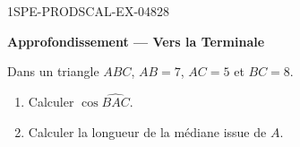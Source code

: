\begin{exercice}{1SPE-PRODSCAL-EX-048}{2}{8}
\begin{center}\textbf{Approfondissement — Vers la Terminale}\end{center}
Dans un triangle $ABC$, $AB = 7$, $AC = 5$ et $BC = 8$.
\begin{enumerate}
  \item Calculer $\cos\widehat{BAC}$.
  \item Calculer la longueur de la médiane issue de $A$.
\end{enumerate}
\end{exercice}
